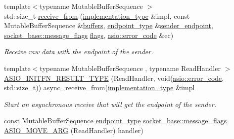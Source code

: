 \begin{DoxyCompactItemize}
\item 
{\footnotesize template$<$typename Mutable\+Buffer\+Sequence $>$ }\\std\+::size\+\_\+t \hyperlink{classasio_1_1raw__socket__service_a45685268e5afce3efb3eabf03a2bf279}{receive\+\_\+from} (\hyperlink{classasio_1_1raw__socket__service_aa2e0ef73d6504fbcab510cb835e9e3d9}{implementation\+\_\+type} \&impl, const Mutable\+Buffer\+Sequence \&\hyperlink{classasio_1_1raw__socket__service_a45cf013e3c3889296ee65fd303253db6}{buffers}, \hyperlink{classasio_1_1raw__socket__service_a8278f352f4e4424d431320f924e8b496}{endpoint\+\_\+type} \&\hyperlink{classasio_1_1raw__socket__service_a0b930d4292ec8fdf3e1065f3d033db49}{sender\+\_\+endpoint}, \hyperlink{classasio_1_1socket__base_ac3cf77465dfedfe1979b5415cf32cc94}{socket\+\_\+base\+::message\+\_\+flags} \hyperlink{classasio_1_1raw__socket__service_a735387eb54985dafc0ba5314df84590a}{flags}, \hyperlink{classasio_1_1error__code}{asio\+::error\+\_\+code} \&ec)
\begin{DoxyCompactList}\small\item\em Receive raw data with the endpoint of the sender. \end{DoxyCompactList}\item 
{\footnotesize template$<$typename Mutable\+Buffer\+Sequence , typename Read\+Handler $>$ }\\\hyperlink{classasio_1_1raw__socket__service_aaba23dd3d04e9f93fe45370d95ad599f}{A\+S\+I\+O\+\_\+\+I\+N\+I\+T\+F\+N\+\_\+\+R\+E\+S\+U\+L\+T\+\_\+\+T\+Y\+P\+E} (Read\+Handler, void(\hyperlink{classasio_1_1error__code}{asio\+::error\+\_\+code}, std\+::size\+\_\+t)) async\+\_\+receive\+\_\+from(\hyperlink{classasio_1_1raw__socket__service_aa2e0ef73d6504fbcab510cb835e9e3d9}{implementation\+\_\+type} \&impl
\begin{DoxyCompactList}\small\item\em Start an asynchronous receive that will get the endpoint of the sender. \end{DoxyCompactList}\item 
const Mutable\+Buffer\+Sequence \hyperlink{classasio_1_1raw__socket__service_a8278f352f4e4424d431320f924e8b496}{endpoint\+\_\+type} \hyperlink{classasio_1_1socket__base_ac3cf77465dfedfe1979b5415cf32cc94}{socket\+\_\+base\+::message\+\_\+flags} \hyperlink{classasio_1_1raw__socket__service_adcdbfd2a8612312b293de5cf6fbfb97d}{A\+S\+I\+O\+\_\+\+M\+O\+V\+E\+\_\+\+A\+R\+G} (Read\+Handler) handler)
\end{DoxyCompactItemize}
